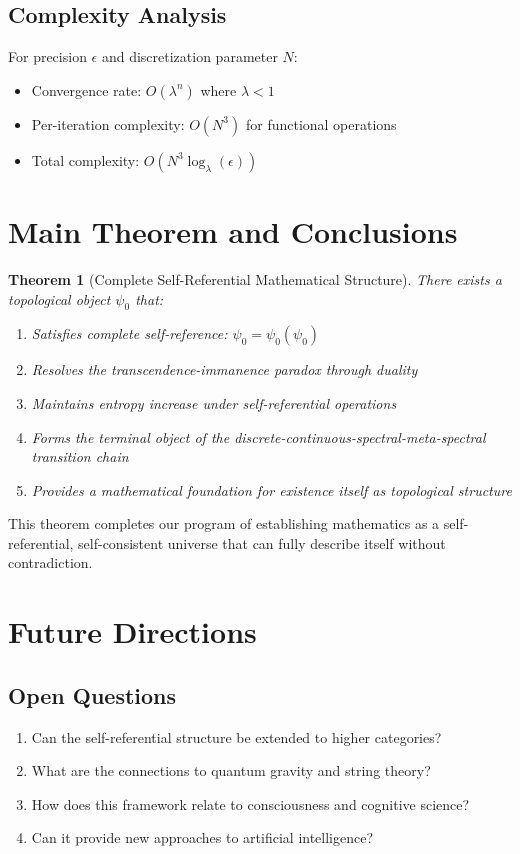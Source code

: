 \documentclass[12pt]{article}
\theoremstyle{plain}
\newtheorem{theorem}{Theorem}[section]
\theoremstyle{definition}
\begin{document}
\subsection{Complexity Analysis}

For precision $\epsilon$ and discretization parameter $N$:
\begin{itemize}
\item Convergence rate: $O(\lambda^n)$ where $\lambda < 1$
\item Per-iteration complexity: $O(N^3)$ for functional operations
\item Total complexity: $O(N^3 \log_\lambda(\epsilon))$
\end{itemize}

\section{Main Theorem and Conclusions}

\begin{theorem}[Complete Self-Referential Mathematical Structure]
\label{thm:main-complete}
There exists a topological object $\psi_0$ that:
\begin{enumerate}
\item Satisfies complete self-reference: $\psi_0 = \psi_0(\psi_0)$
\item Resolves the transcendence-immanence paradox through duality
\item Maintains entropy increase under self-referential operations
\item Forms the terminal object of the discrete-continuous-spectral-meta-spectral transition chain
\item Provides a mathematical foundation for existence itself as topological structure
\end{enumerate}
\end{theorem}

This theorem completes our program of establishing mathematics as a self-referential, self-consistent universe that can fully describe itself without contradiction.

\section{Future Directions}

\subsection{Open Questions}
\begin{enumerate}
\item Can the self-referential structure be extended to higher categories?
\item What are the connections to quantum gravity and string theory?
\item How does this framework relate to consciousness and cognitive science?
\item Can it provide new approaches to artificial intelligence?
\end{enumerate}
\end{document}
